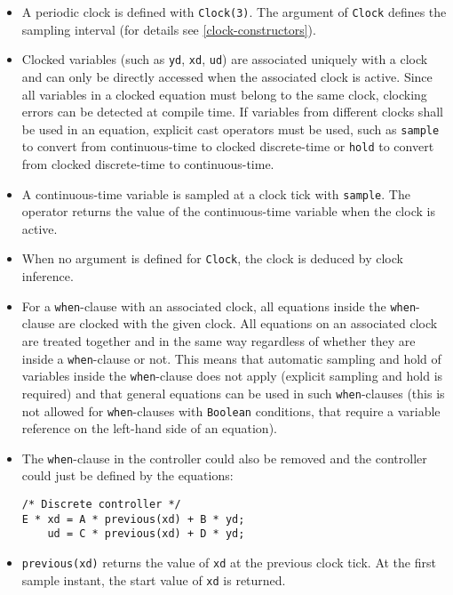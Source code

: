 \begin{itemize}
\item
  A periodic clock is defined with \lstinline!Clock(3)!. The argument
  of \lstinline!Clock! defines the sampling interval (for details see \cref{clock-constructors}).
\item
  Clocked variables (such as \lstinline!yd!, \lstinline!xd!, \lstinline!ud!) are associated uniquely
  with a clock and can only be directly accessed when the associated
  clock is active. Since all variables in a clocked equation must belong
  to the same clock, clocking errors can be detected at compile time. If
  variables from different clocks shall be used in an equation, explicit
  cast operators must be used, such as \lstinline!sample! to convert
  from continuous-time to clocked discrete-time or \lstinline!hold! to
  convert from clocked discrete-time to continuous-time.
\item
  A continuous-time variable is sampled at a clock tick with
  \lstinline!sample!. The operator returns the value of the
  continuous-time variable when the clock is active.
\item
  When no argument is defined for \lstinline!Clock!, the clock is
  deduced by clock inference.
\item
  For a \lstinline!when!-clause with an associated clock, all equations inside the \lstinline!when!-clause are clocked with the given clock.  All equations on an associated clock are treated together and in the same way regardless of whether they are inside a \lstinline!when!-clause or not.  This means that automatic sampling and hold of variables inside the \lstinline!when!-clause does not apply (explicit sampling and hold is required) and that general equations can be used in such \lstinline!when!-clauses (this is not allowed for \lstinline!when!-clauses with \lstinline!Boolean! conditions, that require a variable reference on the left-hand side of an equation).
\item
  The \lstinline!when!-clause in the controller could also be removed
  and the controller could just be defined by the equations:
\begin{lstlisting}[language=modelica]
/* Discrete controller */
E * xd = A * previous(xd) + B * yd;
    ud = C * previous(xd) + D * yd;
\end{lstlisting}
\item
  \lstinline!previous(xd)! returns the value of \lstinline!xd! at
  the previous clock tick. At the first sample instant, the start value
  of \lstinline!xd! is returned.

\end{itemize}
